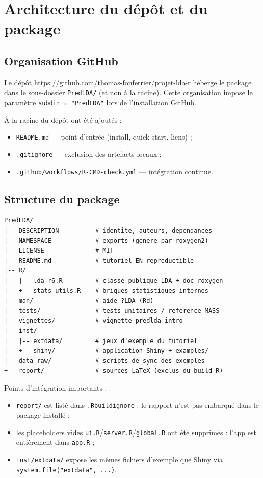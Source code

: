 \documentclass[11pt,a4paper]{article}
\begin{document}
\section{Architecture du d\'ep\^ot et du package}

\subsection{Organisation GitHub}

Le d\'ep\^ot
\url{https://github.com/thomas-fonferrier/projet-lda-r}
h\'eberge le package dans le sous-dossier \texttt{PredLDA/} (et non \`a la
racine). Cette organisation impose le param\`etre
\texttt{subdir = "PredLDA"} lors de l'installation GitHub.

\`A la racine du d\'ep\^ot ont \'et\'e ajout\'es :
\begin{itemize}[leftmargin=*]
  \item \texttt{README.md} --- point d'entr\'ee (install, quick start, liens) ;
  \item \texttt{.gitignore} --- exclusion des artefacts locaux ;
  \item \texttt{.github/workflows/R-CMD-check.yml} --- int\'egration continue.
\end{itemize}

\subsection{Structure du package}

\begin{lstlisting}
PredLDA/
|-- DESCRIPTION          # identite, auteurs, dependances
|-- NAMESPACE            # exports (genere par roxygen2)
|-- LICENSE              # MIT
|-- README.md            # tutoriel EN reproductible
|-- R/
|   |-- lda_r6.R         # classe publique LDA + doc roxygen
|   +-- stats_utils.R    # briques statistiques internes
|-- man/                 # aide ?LDA (Rd)
|-- tests/               # tests unitaires / reference MASS
|-- vignettes/           # vignette predlda-intro
|-- inst/
|   |-- extdata/         # jeux d'exemple du tutoriel
|   +-- shiny/           # application Shiny + examples/
|-- data-raw/            # scripts de sync des exemples
+-- report/              # sources LaTeX (exclus du build R)
\end{lstlisting}

Points d'int\'egration importants :
\begin{itemize}[leftmargin=*]
  \item \texttt{report/} est list\'e dans \texttt{.Rbuildignore} : le rapport
        n'est pas embarqu\'e dans le package install\'e ;
  \item les placeholders vides \texttt{ui.R}/\texttt{server.R}/\texttt{global.R}
        ont \'et\'e supprim\'es : l'app est enti\`erement dans \texttt{app.R} ;
  \item \texttt{inst/extdata/} expose les m\^emes fichiers d'exemple que Shiny
        via \texttt{system.file("extdata", ...)}.
\end{itemize}
\end{document}
